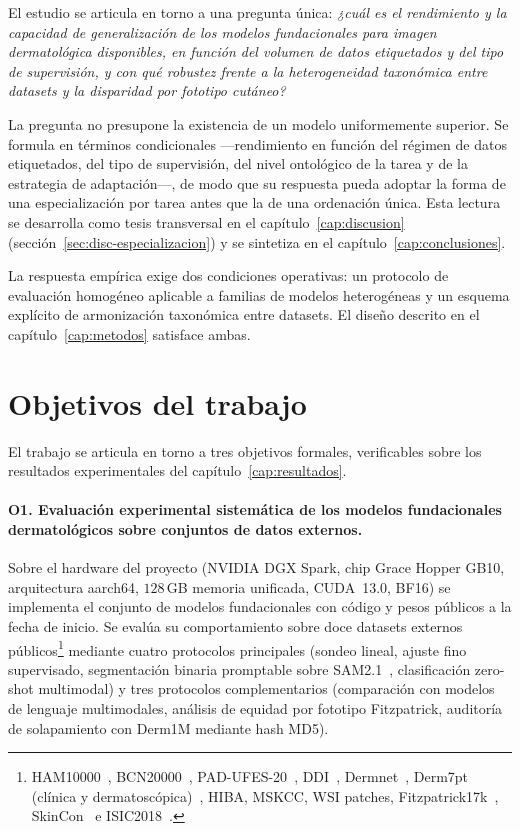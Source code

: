 El estudio se articula en torno a una pregunta única: \emph{¿cuál
es el rendimiento y la capacidad de generalización de los modelos
fundacionales para imagen dermatológica disponibles, en función del
volumen de datos etiquetados y del tipo de supervisión, y con qué
robustez frente a la heterogeneidad taxonómica entre datasets y la
disparidad por fototipo cutáneo?}

La pregunta no presupone la existencia de un modelo uniformemente
superior. Se formula en términos condicionales ---rendimiento en
función del régimen de datos etiquetados, del tipo de supervisión,
del nivel ontológico de la tarea y de la estrategia de
adaptación---, de modo que su respuesta pueda adoptar la forma de
una especialización por tarea antes que la de una ordenación única.
Esta lectura se desarrolla como tesis transversal en el
capítulo~\ref{cap:discusion}
(sección~\ref{sec:disc-especializacion}) y se sintetiza en el
capítulo~\ref{cap:conclusiones}.

La respuesta empírica exige dos condiciones operativas: un
protocolo de evaluación homogéneo aplicable a familias de modelos
heterogéneas y un esquema explícito de armonización taxonómica
entre datasets. El diseño descrito en el
capítulo~\ref{cap:metodos} satisface ambas.


\section{Objetivos del trabajo}
\label{sec:objetivos}

El trabajo se articula en torno a tres objetivos formales,
verificables sobre los resultados experimentales del
capítulo~\ref{cap:resultados}.

\paragraph{O1. Evaluación experimental sistemática de los modelos
fundacionales dermatológicos sobre conjuntos de datos externos.}
Sobre el hardware del proyecto (NVIDIA DGX Spark, chip Grace Hopper
GB10, arquitectura aarch64, $128$\,GB memoria unificada,
CUDA~13.0, BF16) se implementa el conjunto de modelos fundacionales
con código y pesos públicos a la fecha de inicio. Se evalúa su
comportamiento sobre doce datasets externos
públicos\footnote{HAM10000~\cite{ham10000},
BCN20000~\cite{bcn20000}, PAD-UFES-20~\cite{padufes},
DDI~\cite{ddi}, Dermnet~\cite{dermnet}, Derm7pt
(clínica y dermatoscópica)~\cite{kawahara2019}, HIBA, MSKCC, WSI
patches, Fitzpatrick17k~\cite{fitzpatrick17k},
SkinCon~\cite{skincon} e ISIC2018~\cite{isic2018}.} mediante cuatro
protocolos principales (sondeo lineal, ajuste fino supervisado,
segmentación binaria promptable sobre SAM2.1~\cite{sam2},
clasificación zero-shot multimodal) y tres protocolos
complementarios (comparación con modelos de lenguaje multimodales,
análisis de equidad por fototipo Fitzpatrick, auditoría de
solapamiento con Derm1M mediante hash MD5).

